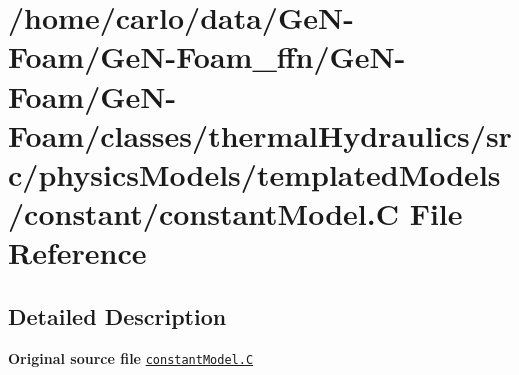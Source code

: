 \hypertarget{constantModel_8C}{}\section{/home/carlo/data/\+Ge\+N-\/\+Foam/\+Ge\+N-\/\+Foam\+\_\+ffn/\+Ge\+N-\/\+Foam/\+Ge\+N-\/\+Foam/classes/thermal\+Hydraulics/src/physics\+Models/templated\+Models/constant/constant\+Model.C File Reference}
\label{constantModel_8C}


\subsection{Detailed Description}
{\bfseries Original source file} \href{../../../home/carlo/data/GeN-Foam/GeN-Foam_ffn/GeN-Foam/GeN-Foam/classes/thermalHydraulics/src/physicsModels/templatedModels/constant/constantModel.C}{\tt constant\+Model.\+C} 